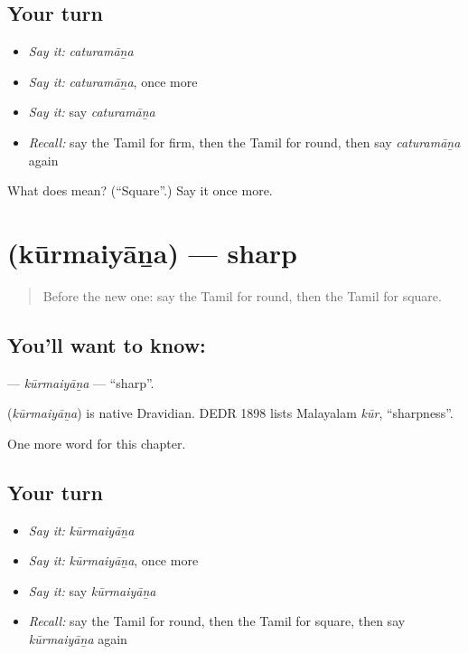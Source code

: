 \subsection*{Your turn}
\begin{itemize}
\raggedright
  \item \emph{Say it:} \emph{caturamāṉa}
  \item \emph{Say it:} \emph{caturamāṉa}, once more
  \item \emph{Say it:} say \emph{caturamāṉa}
  \item \emph{Recall:} say the Tamil for firm, then the Tamil for round, then say \emph{caturamāṉa} again
\end{itemize}

\begin{tcolorbox}[breakable,colback=teal!4,colframe=teal!35!black,title={Before you move on}]
What does  mean? (\textquotedblleft{}Square\textquotedblright{}.) Say it once more.
\end{tcolorbox}
\section[\texorpdfstring{\ta{கூர்மையான} (kūrmaiyāṉa)}{கூர்மையான (kūrmaiyāṉa)}]{ (kūrmaiyāṉa) — sharp}

\label{lesson:TA-C240-kurmaiyana}



\begin{quote}
Before the new one: say the Tamil for round, then the Tamil for square.
\end{quote}

\subsection*{You'll want to know: }
\textbf{} — \emph{kūrmaiyāṉa} — \textquotedblleft{}sharp\textquotedblright{}.

\begin{cousinweb}
\textbf{} (\emph{kūrmaiyāṉa}) is native Dravidian. DEDR 1898 lists Malayalam \emph{kūr}, \textquotedblleft{}sharpness\textquotedblright{}.
\end{cousinweb}

\begin{grammarlens}[title={What you've built}]
One more word for this chapter.
\end{grammarlens}

\subsection*{Your turn}
\begin{itemize}
\raggedright
  \item \emph{Say it:} \emph{kūrmaiyāṉa}
  \item \emph{Say it:} \emph{kūrmaiyāṉa}, once more
  \item \emph{Say it:} say \emph{kūrmaiyāṉa}
  \item \emph{Recall:} say the Tamil for round, then the Tamil for square, then say \emph{kūrmaiyāṉa} again
\end{itemize}

